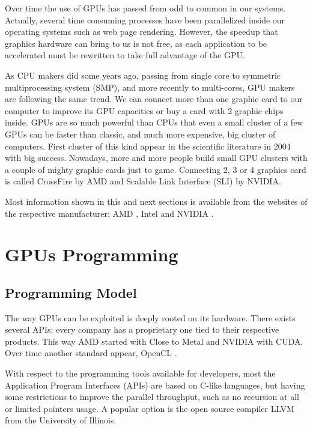 \documentclass[Afour,sageh,times]{sagej}
\begin{document}
Over time the use of GPUs has passed from odd to common in our
systems. Actually, several time consuming processes have been
parallelized inside our operating systems such as web page
rendering. However, the speedup that graphics hardware can bring to us
is not free, as each application to be accelerated must be rewritten
to take full advantage of the GPU.

As CPU makers did some years ago, passing from single core to symmetric multiprocessing system (SMP), and more recently to multi-cores, GPU makers are following the same trend. We can connect more than one graphic card to our computer to improve its GPU capacities or buy a card with 2 graphic chips inside. GPUs are so much powerful than CPUs that even a small cluster of a few GPUs can be faster than classic, and much more expensive, big cluster of computers. First cluster of this kind appear in the scientific literature in 2004 \citep{10.1109/SC.2004.26} with big success. Nowadays, more and more people build small GPU clusters with a couple of mighty graphic cards just to game. Connecting 2, 3 or 4 graphics card is called CrossFire by AMD and Scalable Link Interface (SLI) by NVIDIA.

Most information shown in this and next sections is available from the websites of the respective manufacturer: AMD \citep{amd}, Intel \citep{intel} and NVIDIA \citep{nvidia}.

\section{GPUs Programming}
\label{sec:programming}

\subsection{Programming Model}

The way GPUs can be exploited is deeply rooted on its hardware. There exists several APIs: every company has a proprietary one tied to their respective products. This way AMD started with Close to Metal and NVIDIA with CUDA. Over time another standard appear, OpenCL \citep{opencl}.

With respect to the programming tools available for developers, most the Application Program Interfaces (APIs) are based on C-like languages, but having some restrictions to improve the parallel throughput, such as no recursion at all or limited pointers usage. A popular option is the open source compiler LLVM \citep{LLVM} from the University of Illinois.
\end{document}
